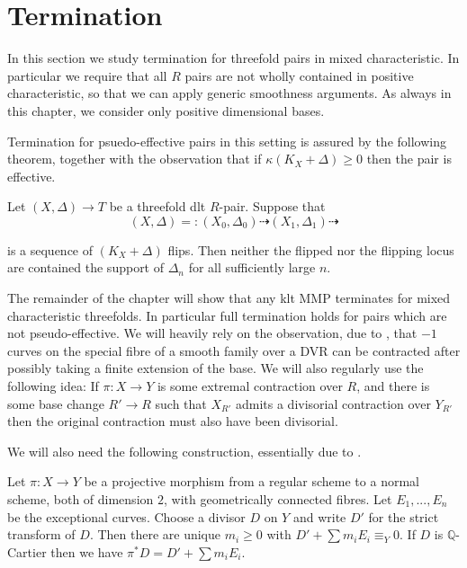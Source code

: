 \documentclass[a4paper,12pt]{amsart}
\begin{document}
	\section{Termination}
		
	In this section we study termination for threefold pairs in mixed characteristic. In particular we require that all $R$ pairs are not wholly contained in positive characteristic, so that we can apply generic smoothness arguments. As always in this chapter, we consider only positive dimensional bases.
	
	Termination for psuedo-effective pairs in this setting is assured by the following theorem, together with the observation that if $\kappa(K_{X}+\Delta) \geq 0$ then the pair is effective. 
	
	\begin{theorem}\cite[Proposition 9.20]{bhatt2020globally+}\label{partial-termination}
		Let $(X,\Delta)\to T$ be a threefold dlt $R$-pair. Suppose that
		$$(X,\Delta)=:(X_{0},\Delta_{0}) \dashrightarrow (X_{1},\Delta_{1}) \dashrightarrow$$
		
		is a sequence of $(K_{X}+\Delta)$ flips. Then neither the flipped nor the flipping locus are contained the support of $\Delta_{n}$ for all sufficiently large $n$.
	\end{theorem}

	The remainder of the chapter will show that any klt MMP terminates for mixed characteristic threefolds. In particular full termination holds for pairs which are not pseudo-effective. We will heavily rely on the observation, due to \cite{katsura1985elliptic}, that $-1$ curves on the special fibre of a smooth family over a DVR can be contracted after possibly taking a finite extension of the base. We will also regularly use the following idea: If $\pi:X \to Y$ is some extremal contraction over $R$, and there is some base change $R' \to R$ such that $X_{R'}$ admits a divisorial contraction over $Y_{R'}$ then the original contraction must also have been divisorial.

	We will also need the following construction, essentially due to \cite{mumford1961topology}.
	
	\begin{lemma}
		
		Let $\pi:X \to Y$ be a projective morphism from a regular scheme to a normal scheme, both of dimension $2$, with geometrically connected fibres. Let $E_{1},...,E_{n}$ be the exceptional curves. Choose a divisor $D$ on $Y$ and write $D'$ for the strict transform of $D$. Then there are unique $m_{i} \geq 0$ with $D'+\sum m_{i}E_{i} \equiv_{Y} 0$. If $D$ is $\mathbb{Q}$-Cartier then we have $\pi^{*}D= D'+\sum m_{i}E_{i}$.
		
	\end{lemma}
	
\end{document}
